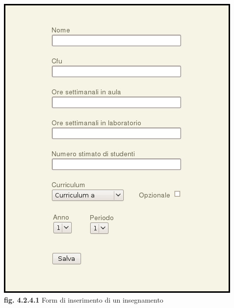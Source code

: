 \documentclass[11pt,a4paper]{article}
\begin{document}
\begin{center}
	\includegraphics[scale=0.5]{images/nuovo_insegnamento.jpg}\\
	\textbf{fig. 4.2.4.1} Form di inserimento di un insegnamento\\
\end{center}
\end{document}
